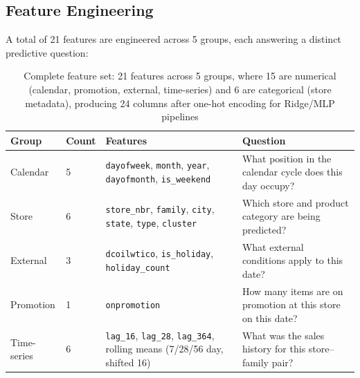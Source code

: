 \subsection{Feature Engineering}

A total of 21 features are engineered across 5 groups, each answering a distinct predictive question:

\begin{table}[H]
\centering{}
\begin{tabular}{l L{2.5cm} L{5.5cm} L{4cm}}
\toprule{}\color{white}\textbf{Group} &\color{white}\textbf{Count} &\color{white}\textbf{Features} &\color{white}\textbf{Question}\\
\midrule
Calendar & 5 & \texttt{dayofweek}, \texttt{month}, \texttt{year}, \texttt{dayofmonth}, \texttt{is\_weekend} & What position in the calendar cycle does this day occupy?\\
Store & 6 & \texttt{store\_nbr}, \texttt{family}, \texttt{city}, \texttt{state}, \texttt{type}, \texttt{cluster} & Which store and product category are being predicted?\\
External & 3 & \texttt{dcoilwtico}, \texttt{is\_holiday}, \texttt{holiday\_count} & What external conditions apply to this date?\\
Promotion & 1 & \texttt{onpromotion} & How many items are on promotion at this store on this date?\\
Time-series & 6 & \texttt{lag\_16}, \texttt{lag\_28}, \texttt{lag\_364}, rolling means (7/28/56 day, shifted 16) & What was the sales history for this store–family pair?\\
\bottomrule
\end{tabular}
\caption{Complete feature set: 21 features across 5 groups, where 15 are numerical (calendar, promotion, external, time-series) and 6 are categorical (store metadata), producing 24 columns after one-hot encoding for Ridge/MLP pipelines}
\end{table}

